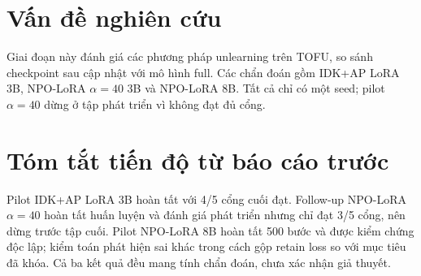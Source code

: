 \documentclass[11pt,a4paper]{article}
\newif\ifshowguide
\newcommand{\guide}[1]{\ifshowguide{\par\small\itshape\color{muted}#1\par\medskip}\fi}
\let\oldsection\section
\renewcommand{\section}{\needspace{6\baselineskip}\oldsection}
\begin{document}
\section{Vấn đề nghiên cứu}
\guide{Nêu vấn đề, ý nghĩa và cách tiếp cận dự kiến trong 3--5 câu.}
Giai đoạn này đánh giá các phương pháp unlearning trên TOFU, so sánh checkpoint sau cập nhật với mô hình full. Các chẩn đoán gồm IDK+AP LoRA 3B, NPO-LoRA $\alpha=40$ 3B và NPO-LoRA 8B. Tất cả chỉ có một seed; pilot $\alpha=40$ dừng ở tập phát triển vì không đạt đủ cổng.

\section{Tóm tắt tiến độ từ báo cáo trước}
\guide{Tóm tắt kết quả chính của kỳ này và mức độ hoàn thành kế hoạch trước đó.}
Pilot IDK+AP LoRA 3B hoàn tất với 4/5 cổng cuối đạt. Follow-up NPO-LoRA $\alpha=40$ hoàn tất huấn luyện và đánh giá phát triển nhưng chỉ đạt 3/5 cổng, nên dừng trước tập cuối. Pilot NPO-LoRA 8B hoàn tất 500 bước và được kiểm chứng độc lập; kiểm toán phát hiện sai khác trong cách gộp retain loss so với mục tiêu đã khóa. Cả ba kết quả đều mang tính chẩn đoán, chưa xác nhận giả thuyết.

\end{document}
